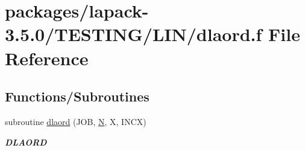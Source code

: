 \hypertarget{dlaord_8f}{}\section{packages/lapack-\/3.5.0/\+T\+E\+S\+T\+I\+N\+G/\+L\+I\+N/dlaord.f File Reference}
\label{dlaord_8f}
\subsection*{Functions/\+Subroutines}
\begin{DoxyCompactItemize}
\item 
subroutine \hyperlink{group__double__lin_ga7352d554002db1120a207ed2ee03a787}{dlaord} (J\+O\+B, \hyperlink{polmisc_8c_a0240ac851181b84ac374872dc5434ee4}{N}, X, I\+N\+C\+X)
\begin{DoxyCompactList}\small\item\em {\bfseries D\+L\+A\+O\+R\+D} \end{DoxyCompactList}\end{DoxyCompactItemize}
